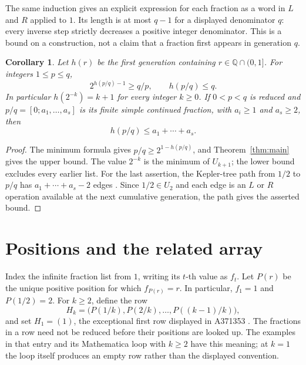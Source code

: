 \documentclass[11pt]{article}
\newtheorem{corollary}[theorem]{Corollary}
\newcommand{\Q}{\mathbb{Q}}
\begin{document}
The same induction gives an explicit expression for each fraction as a
word in $L$ and $R$ applied to $1$. Its length is at most $q-1$ for a
displayed denominator $q$: every inverse step strictly decreases a
positive integer denominator. This is a bound on a construction, not a
claim that a fraction first appears in generation $q$.

\begin{corollary}\label{cor:depth}
Let $h(r)$ be the first generation containing $r\in\Q\cap(0,1]$.
For integers $1\le p\le q$,
\[
 2^{h(p/q)-1}\ge q/p,\qquad h(p/q)\le q.
\]
In particular $h(2^{-k})=k+1$ for every integer $k\ge0$.
If $0<p<q$ is reduced and
$p/q=[0;a_1,\ldots,a_s]$ is its finite simple continued fraction,
with $a_i\ge1$ and $a_s\ge2$, then
\[
 h(p/q)\le a_1+\cdots+a_s.
\]
\end{corollary}
\begin{proof}
The minimum formula gives $p/q\ge2^{1-h(p/q)}$, and
Theorem~\ref{thm:main} gives the upper bound.
The value $2^{-k}$ is the minimum of $U_{k+1}$; the lower bound excludes
every earlier list.
For the last assertion, the Kepler-tree path from $1/2$ to $p/q$
has $a_1+\cdots+a_s-2$ edges
\cite[Lemma 3.1]{minkowski}. Since $1/2\in U_2$ and each edge is an
$L$ or $R$ operation available at the next cumulative generation,
the path gives the asserted bound.
\end{proof}

\section{Positions and the related array}
Index the infinite fraction list from $1$, writing its $t$-th value as
$f_t$. Let $P(r)$ be the unique positive position for which $f_{P(r)}=r$.
In particular, $f_1=1$ and $P(1/2)=2$.
For $k\ge2$, define the row
\begin{equation}\label{eq:rows}
 H_k=\bigl(P(1/k),P(2/k),\ldots,P((k-1)/k)\bigr),
\end{equation}
and set $H_1=(1)$, the exceptional first row displayed in A371353
\cite{positions}. The fractions in a row need not be reduced before
their positions are looked up. The examples in that entry and its
Mathematica loop with $k\ge2$ have this meaning; at $k=1$ the loop
itself produces an empty row rather than the displayed convention.
\end{document}
